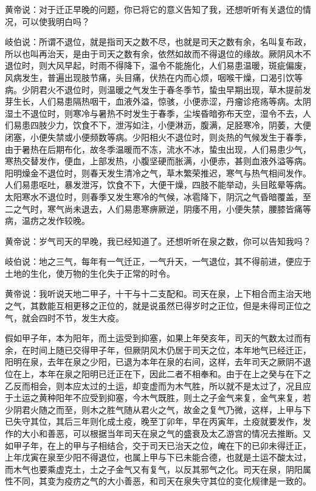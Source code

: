 \documentclass[a4paper,12pt,UTF8,twoside]{ctexbook}
\begin{document}
黄帝说：对于迁正早晚的问题，你已将它的意义告知了我，还想听听有关退位的情况，可以使我明白吗？

岐伯说：所谓不退位，就是指司天之数不尽，也就是司天之数有余，名叫复布政，所以也叫再治天，是由于司天之数有余，依然如故而不得退位的缘故。厥阴风木不退位时，则大风早起，时雨不得降下，温令不能施化，人们易患温暖，斑疵偏废，风病发生，普遍出现肢节痛，头目痛，伏热在内而心烦，咽喉干燥，口渴引饮等病。少阴君火不退位时，则温暖之气发生于春冬季节，蛰虫早期出现，草木提前发芽生长，人们易患隔热咽干，血液外溢，惊骇，小便赤涩，丹瘤诊疮疡等病。太阴湿土不退位时，则寒冷与暑热不时发生于春季，尘埃昏暗弥布天空，湿令不去，人们易患四肢少力，饮食不下，泄泻如注，小便淋沥，腹满，足胫寒冷，阴萎，大便闭塞，小便失禁或小便频数等病。少阳相火不退位时，则炎热的气候发生于春季，由于暑热在后期布化，故冬季温暖而不冻，流水不冰，蛰虫出现，人们易患少气，寒热交替发作，便血，上部发热，小腹坚硬而胀满，小便赤，甚则血液外溢等病。阳明燥金不退位时，则春天发生清冷之气，草木繁荣推迟，寒气与热气相间发作。人们易患呕吐，暴发泄泻，饮食不下，大便干燥，四肢不能举动，头目眩晕等病。太阳寒水不退位时，则春季又发生寒冷的气候，冰雹降下，阴沉之气昏暗覆盖，至二之气时，寒气尚未退去，人们易患寒痹厥逆，阴痿不用，小便失禁，腰膝皆痛等病，温疠之发作较晚。

黄帝说：岁气司天的早晚，我已经知道了。还想听听在泉之数，你可以告知我吗？

岐伯说：地之三气，每年有一气迁正，一气升天，一气退位，其不得前进，便应于土地的生化，使万物的生化失于正常的时令。

黄帝说：我听说天地二甲子，十干与十二支配和。司天在泉，上下相合而主治天地之气，其数能互相更移之正位的，就是说虽然已得岁时之正位，但是未得司正位之气，就会四时不节，发生大疫。

假如甲子年，本为阳年，而土运受到抑塞，如果上年癸亥年，司天的气数太过而有余，在时间上随已交得甲子年，但厥阴风木仍居于司天之位，本年地气已经迁正，阳明在泉，去年在泉之少阳，已退为本年在泉的右间，这样，去年司天之厥阴不退位在上，本年在泉之阳明已迁正在下，因此二者不相奉和。由于在上之癸与在下之乙反而相会，则本应太过的土运，却变虚而为木气胜，所以就不是太过了，况且应于土运之黄种阳年不应受到抑塞，今木气既胜，则土之子金气来复，金气来复，若少阴君火随之而至，则木之胜气随从君火之气，故金之复气乃微，这样，上甲与下已失守其位，其后三年则化成土疫，晚至丁卯年，早在丙寅年，土疫就要发作，发作的大小和善恶，可以根据当年司天在泉之气的盛衰及太乙游宫的情况去推断。又如甲子年，在上的甲与子相结合，交于司天已治天之位，崦在下的已卯未得迁正，上年戊寅在泉至少阳不得退位，也属上甲与下已未能合德，也就是土运不酸太过，而木气也要乘虚克土，土之子金气又有复气，以反其邪气之化。司天在泉，阴阳属性不同，其变为疫疠之气的大小善恶，和司天在泉失守其位的变化规律是一致的。
\end{document}
